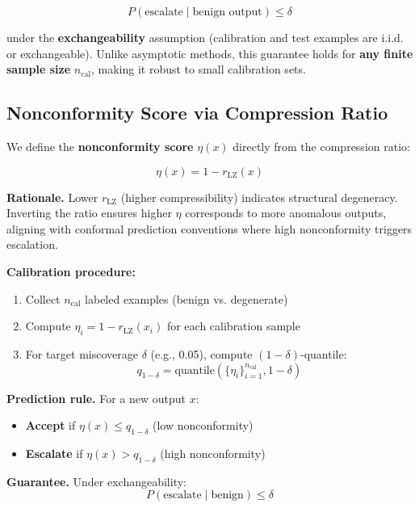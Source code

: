 \documentclass[11pt]{article}
\begin{document}
\begin{equation}
P(\text{escalate} \mid \text{benign output}) \le \delta
\end{equation}

under the \textbf{exchangeability} assumption (calibration and test examples are i.i.d. or exchangeable). Unlike asymptotic methods, this guarantee holds for \textbf{any finite sample size} $n_{\text{cal}}$, making it robust to small calibration sets.

\subsection{Nonconformity Score via Compression Ratio}
\label{sec:conformal-scores}

We define the \textbf{nonconformity score} $\eta(x)$ directly from the compression ratio:

\begin{equation}
\eta(x) = 1 - r_{\text{LZ}}(x)
\end{equation}

\textbf{Rationale.} Lower $r_{\text{LZ}}$ (higher compressibility) indicates structural degeneracy. Inverting the ratio ensures higher $\eta$ corresponds to more anomalous outputs, aligning with conformal prediction conventions where high nonconformity triggers escalation.

\textbf{Calibration procedure:}
\begin{enumerate}
\item Collect $n_{\text{cal}}$ labeled examples (benign vs. degenerate)
\item Compute $\eta_i = 1 - r_{\text{LZ}}(x_i)$ for each calibration sample
\item For target miscoverage $\delta$ (e.g., 0.05), compute $(1-\delta)$-quantile:
\begin{equation}
q_{1-\delta} = \text{quantile}(\{\eta_i\}_{i=1}^{n_{\text{cal}}}, 1-\delta)
\end{equation}
\end{enumerate}

\textbf{Prediction rule.} For a new output $x$:
\begin{itemize}
\item \textbf{Accept} if $\eta(x) \leq q_{1-\delta}$ (low nonconformity)
\item \textbf{Escalate} if $\eta(x) > q_{1-\delta}$ (high nonconformity)
\end{itemize}

\textbf{Guarantee.} Under exchangeability:
\begin{equation}
P(\text{escalate} \mid \text{benign}) \leq \delta
\end{equation}
\end{document}
